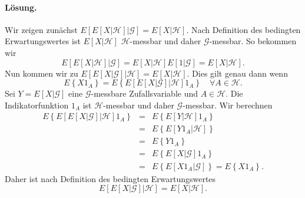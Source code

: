 \paragraph*{Lösung.} Wir zeigen zunächst 
$E\left[ E\left[ X | \mathcal H \right] | \mathcal G \right]=E \left[ X | \mathcal H \right]$.
Nach Definition des bedingten Erwartungswertes ist $E\left[ X| \mathcal H \right]$ 
$\mathcal H$-messbar und daher $\mathcal G$-messbar. So bekommen wir 
\begin{equation*}
	E\left[ E\left[ X | \mathcal H \right] | \mathcal G \right] =
	E\left[ X| \mathcal H \right] E\left[ 1|\mathcal G \right] = 
	E \left[ X | \mathcal H \right ].
\end{equation*}
Nun kommen wir zu 
$E\left[ E\left[ X | \mathcal G \right] | \mathcal H \right]=E \left[ X | \mathcal H \right]$.
Dies gilt genau dann wenn 
\begin{equation*}
	E\left\{ X 1_A \right\} 
	= E\left\{ E\left[ E\left[ X|\mathcal G \right]|\mathcal H \right] 1_A \right\}  
	\quad \forall A\in\mathcal H.
\end{equation*}
Sei $Y=E\left[ X|\mathcal G \right]$ eine $\mathcal G$-messbare Zufallsvariable und
$A\in\mathcal H$. Die Indikatorfunktion $1_A$ ist $\mathcal H$-messbar und daher
$\mathcal G$-messbar. Wir berechnen
\begin{eqnarray*}
	E\left\{ E\left[ E\left[ X|\mathcal G \right]|\mathcal H \right] 1_A \right\} &=& 
	E\left\{ E\left[ Y|\mathcal H \right] 1_A \right\} \\
	&=& E\left\{ E\left[ Y 1_A| \mathcal H \right] \right\} \\
	&=& E\left\{ Y 1_A \right\} \\
	&=& E\left\{ E\left[ X|\mathcal G \right] 1_A \right\} \\
	&=& E\left\{ E\left[ X 1_A| \mathcal G \right] \right\} = E\left\{ X 1_A \right\}. 
\end{eqnarray*}
Daher ist nach Definition des bedingten Erwartungswertes
\begin{equation*}
    E\left[ E\left[ X | \mathcal G \right] | \mathcal H \right]=E \left[ X |
    \mathcal H \right].
\end{equation*}


